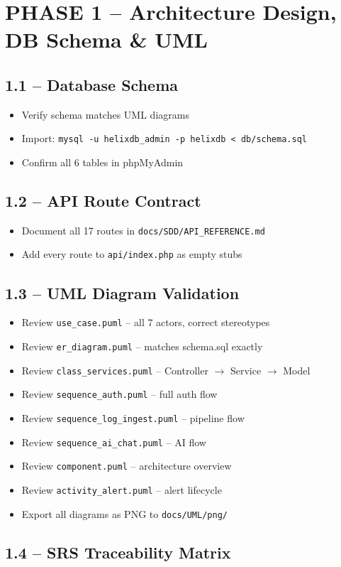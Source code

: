\documentclass[11pt,a4paper]{article}
\newcommand{\undone}{\textcolor{helixgray}{\texttt{[ ] }}}
\newcommand{\done}{\textcolor{helixteal}{\textbf{[x] }}}
\newcommand{\filepath}[1]{\texttt{\small#1}}
\newcommand{\task}[2]{\item[#1] #2}
\begin{document}
\section{PHASE 1 -- Architecture Design, DB Schema \& UML}

\subsection{1.1 -- Database Schema}

\begin{itemize}
    \task{\done}{Verify schema matches UML diagrams}
    \task{\undone}{Import: \texttt{mysql -u helixdb\_admin -p helixdb < db/schema.sql}}
    \task{\undone}{Confirm all 6 tables in phpMyAdmin}
\end{itemize}

\subsection{1.2 -- API Route Contract}

\begin{itemize}
    \task{\undone}{Document all 17 routes in \filepath{docs/SDD/API\_REFERENCE.md}}
    \task{\undone}{Add every route to \filepath{api/index.php} as empty stubs}
\end{itemize}

\subsection{1.3 -- UML Diagram Validation}

\begin{itemize}
    \task{\undone}{Review \filepath{use\_case.puml} -- all 7 actors, correct stereotypes}
    \task{\undone}{Review \filepath{er\_diagram.puml} -- matches schema.sql exactly}
    \task{\undone}{Review \filepath{class\_services.puml} -- Controller $\rightarrow$ Service $\rightarrow$ Model}
    \task{\undone}{Review \filepath{sequence\_auth.puml} -- full auth flow}
    \task{\undone}{Review \filepath{sequence\_log\_ingest.puml} -- pipeline flow}
    \task{\undone}{Review \filepath{sequence\_ai\_chat.puml} -- AI flow}
    \task{\undone}{Review \filepath{component.puml} -- architecture overview}
    \task{\undone}{Review \filepath{activity\_alert.puml} -- alert lifecycle}
    \task{\undone}{Export all diagrams as PNG to \filepath{docs/UML/png/}}
\end{itemize}

\subsection{1.4 -- SRS Traceability Matrix}
\end{document}
